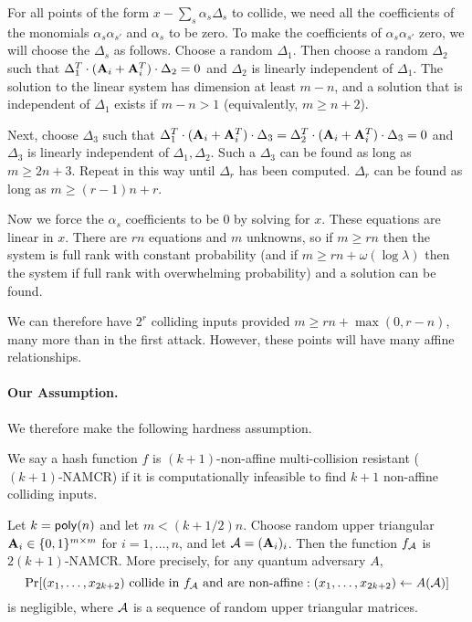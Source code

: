 \begin{itemize}
	For all points of the form $x-\sum_s \alpha_s \Delta_s$ to collide, we need all the coefficients of the monomials $\alpha_s\alpha_{s'}$ and $\alpha_s$ to be zero.  To make the coefficients of $\alpha_s\alpha_{s'}$ zero, we will choose the $\Delta_s$ as follows.  Choose a random $\Delta_1$.  Then choose a random $\Delta_2$ such that $\Delta_1^T\cdot({\mathbf{A}}_i+{\mathbf{A}}_i^T)\cdot\Delta_{2}=0$ and $\Delta_2$ is linearly independent of $\Delta_1$.  The solution to the linear system has dimension at least $m-n$, and a solution that is independent of $\Delta_1$ exists if $m-n>1$ (equivalently, $m\geq n+2$).  
	
	Next, choose $\Delta_3$ such that $\Delta_1^T\cdot({\mathbf{A}}_i+{\mathbf{A}}_i^T)\cdot\Delta_{3}=\Delta_2^T\cdot({\mathbf{A}}_i+{\mathbf{A}}_i^T)\cdot\Delta_{3}=0$ and $\Delta_3$ is linearly independent of $\Delta_1,\Delta_2$.  Such a $\Delta_3$ can be found as long as $m\geq 2n+3$.  Repeat in this way until $\Delta_r$ has been computed.  $\Delta_r$ can be found as long as $m\geq (r-1)n+ r$.  
	
	Now we force the $\alpha_s$ coefficients to be 0 by solving for $x$.  These equations are linear in $x$.  There are $rn$ equations and $m$ unknowns, so if  $m\geq rn$ then the system is full rank with constant probability (and if $m\geq rn+\omega(\log\lambda)$ then the system if full rank with overwhelming probability) and a solution can be found.
	
	\medskip
	
	We can therefore have $2^r$ colliding inputs provided $m\geq r n + \max(0,r-n)$, many more than in the first attack.  However, these points will have many affine relationships.
\end{itemize}

\paragraph{Our Assumption.}  We therefore make the following hardness assumption.  

We say a hash function $f$ is $(k+1)$-non-affine multi-collision resistant ($(k+1)$-NAMCR) if it is computationally infeasible to find $k+1$ non-affine colliding inputs.

\begin{assumption}\label{assump:degreetwo} Let $k={\sf poly}(n)$ and let $m<(k+1/2)n$.  Choose random upper triangular ${\mathbf{A}}_i\in\{0,1\}^{m\times m}$ for $i=1,\dots,n$, and let ${\mathcal{A}}=({\mathbf{A}}_i)_i$.  Then the function $f_{\mathcal{A}}$ is $2(k+1)$-NAMCR.  More precisely, for any quantum adversary $A$, 
	\[\Pr[(x_1,\dots,x_{2k+2})\text{ collide in $f_{{\mathcal{A}}}$ and are non-affine}:(x_1,\dots,x_{2k+2})\gets A({\mathcal{A}})]\]
is negligible, where ${\mathcal{A}}$ is a sequence of random upper triangular matrices.
\end{assumption}

